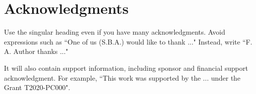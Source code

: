 \section*{Acknowledgments}
Use the singular heading even if you have many acknowledgments. Avoid expressions such as ``One of us (S.B.A.) would like to thank ..." Instead, write ``F. A. Author thanks ..."

It will also contain support information, including sponsor and financial support acknowledgment. For example, ``This work was supported by the ... under the Grant T2020-PC000".
